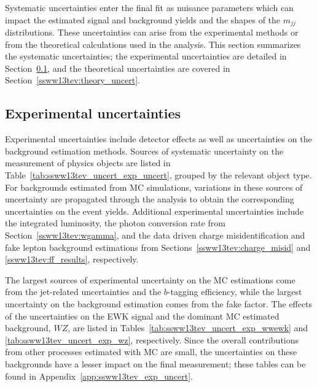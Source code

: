 Systematic uncertainties enter the final fit as nuisance parameters which can impact the estimated signal and background yields and the shapes of the $m_{jj}$ distributions.
These uncertainties can arise from the experimental methods or from the theoretical calculations used in the analysis.
This section summarizes the systematic uncertainties; the experimental uncertainties are detailed in Section~\ref{ssww13tev:experimental_uncert}, and the theoretical uncertainties are covered in Section~\ref{ssww13tev:theory_uncert}.

\subsection{Experimental uncertainties}\label{ssww13tev:experimental_uncert}
Experimental uncertainties include detector effects as well as uncertainties on the background estimation methods.
Sources of systematic uncertainty on the measurement of physics objects are listed in Table~\ref{tab:ssww13tev_uncert_exp_uncert}, grouped by the relevant object type.
For backgrounds estimated from MC simulations, variations in these sources of uncertainty are propagated through the analysis to obtain the corresponding uncertainties on the event yields.
Additional experimental uncertainties include the integrated luminosity, the photon conversion rate from Section~\ref{ssww13tev:wgamma}, and the data driven charge misidentification and fake lepton background estimations from Sections~\ref{ssww13tev:charge_misid} and \ref{ssww13tev:ff_results}, respectively.

The largest sources of experimental uncertainty on the MC estimations come from the jet-related uncertainties and the $b$-tagging efficiency, while the largest uncertainty on the background estimation comes from the fake factor.
The effects of the uncertainties on the \ssww EWK signal and the dominant MC estimated background, $WZ$, are listed in Tables~\ref{tab:ssww13tev_uncert_exp_wwewk} and \ref{tab:ssww13tev_uncert_exp_wz}, respectively.
Since the overall contributions from other processes estimated with MC are small, the uncertainties on these backgrounds have a lesser impact on the final measurement; these tables can be found in Appendix~\ref{app:ssww13tev_exp_uncert}.

